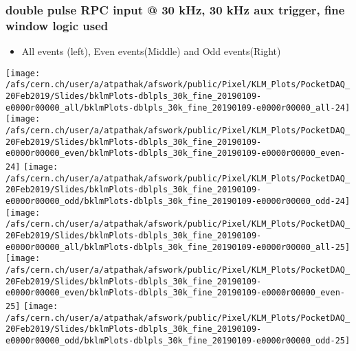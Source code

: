 \documentclass{beamer}
\begin{document}
\begin{frame}
\frametitle{\small double pulse RPC input @ 30 kHz, 30 kHz aux trigger, fine window logic used}
\vspace*{.05cm}
\begin{center}
 \begin{itemize}
\item { \small All events (left), Even events(Middle) and Odd events(Right)}
\end{itemize}
\begin{normalsize}

\vspace*{-.2cm}
\begin{center}

\texttt{[image: /afs/cern.ch/user/a/atpathak/afswork/public/Pixel/KLM\_Plots/PocketDAQ\_20Feb2019/Slides/bklmPlots-dblpls\_30k\_fine\_20190109-e0000r00000\_all/bklmPlots-dblpls\_30k\_fine\_20190109-e0000r00000\_all-24]}
\texttt{[image: /afs/cern.ch/user/a/atpathak/afswork/public/Pixel/KLM\_Plots/PocketDAQ\_20Feb2019/Slides/bklmPlots-dblpls\_30k\_fine\_20190109-e0000r00000\_even/bklmPlots-dblpls\_30k\_fine\_20190109-e0000r00000\_even-24]}
\texttt{[image: /afs/cern.ch/user/a/atpathak/afswork/public/Pixel/KLM\_Plots/PocketDAQ\_20Feb2019/Slides/bklmPlots-dblpls\_30k\_fine\_20190109-e0000r00000\_odd/bklmPlots-dblpls\_30k\_fine\_20190109-e0000r00000\_odd-24]} \\

\texttt{[image: /afs/cern.ch/user/a/atpathak/afswork/public/Pixel/KLM\_Plots/PocketDAQ\_20Feb2019/Slides/bklmPlots-dblpls\_30k\_fine\_20190109-e0000r00000\_all/bklmPlots-dblpls\_30k\_fine\_20190109-e0000r00000\_all-25]}
\texttt{[image: /afs/cern.ch/user/a/atpathak/afswork/public/Pixel/KLM\_Plots/PocketDAQ\_20Feb2019/Slides/bklmPlots-dblpls\_30k\_fine\_20190109-e0000r00000\_even/bklmPlots-dblpls\_30k\_fine\_20190109-e0000r00000\_even-25]}
\texttt{[image: /afs/cern.ch/user/a/atpathak/afswork/public/Pixel/KLM\_Plots/PocketDAQ\_20Feb2019/Slides/bklmPlots-dblpls\_30k\_fine\_20190109-e0000r00000\_odd/bklmPlots-dblpls\_30k\_fine\_20190109-e0000r00000\_odd-25]} \\

\end{center}
\end{normalsize}
\end{center}
\end{frame}
\end{document}
